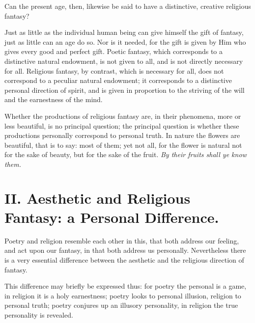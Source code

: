 \documentclass[12pt,a4paper]{book}
\begin{document}
Can the present age, then, likewise be said to have a distinctive, creative religious fantasy?

Just as little as the individual human being can give himself the gift of fantasy, just as little can an age do so. Nor is it needed, for the gift is given by Him who gives every good and perfect gift. Poetic fantasy, which corresponds to a distinctive natural endowment, is not given to all, and is not directly necessary for all. Religious fantasy, by contrast, which is necessary for all, does not correspond to a peculiar natural endowment; it corresponds to a distinctive personal direction of spirit, and is given in proportion to the striving of the will and the earnestness of the mind.

Whether the productions of religious fantasy are, in their phenomena, more or less beautiful, is no principal question; the principal question is whether these productions personally correspond to personal truth. In nature the flowers are beautiful, that is to say: most of them; yet not all, for the flower is natural not for the sake of beauty, but for the sake of the fruit. \emph{By their fruits shall ye know them.}

\chapter*{II. Aesthetic and Religious Fantasy: a Personal Difference.}
\label{ch:forel2}

Poetry and religion resemble each other in this, that both address our feeling, and act upon our fantasy, in that both address us personally. Nevertheless there is a very essential difference between the aesthetic and the religious direction of fantasy.

This difference may briefly be expressed thus: for poetry the personal is a game, in religion it is a holy earnestness; poetry looks to personal illusion, religion to personal truth; poetry conjures up an illusory personality, in religion the true personality is revealed.
\end{document}
